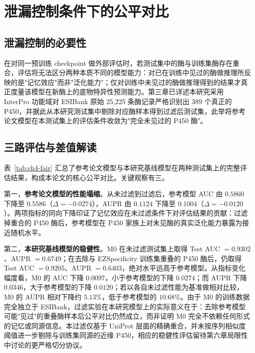 \section{泄漏控制条件下的公平对比}
\label{sec:ch4-fair}

\subsection{泄漏控制的必要性}

在对同一预训练 checkpoint 做外部评估时，若测试集中的酶与训练集酶存在重合，评估将无法区分两种本质不同的模型能力：对已在训练中见过的酶做推理所反映的是"记忆效应"而非"泛化能力"；仅对训练中未见过的酶做推理得到的结果才真正度量该模型在新酶上的底物特异性预测能力。第三章已详述本研究采用 InterPro\cite{Blum2025} 功能域对 ESIBank 原始 25{,}225 条酶记录严格识别出 389 个真正的 P450，并据此从本研究测试集中剔除对应酶样本得到过滤后测试集，此举将参考论文模型在本测试集上的评估条件收敛为"完全未见过的 P450 酶"。

\subsection{三路评估与差值解读}

表~\ref{tab:ch4-fair} 汇总了参考论文模型与本研究基线模型在两种测试集上的完整评估结果，构成本论文的核心公平对比。关键观察有三。

第一，\textbf{参考论文模型的性能塌缩}。从未过滤到过滤后，参考模型 AUC 由 $0.5860$ 下降至 $0.5586$（$\Delta = -0.0274$），AUPR 由 $0.1124$ 下降至 $0.1004$（$\Delta = -0.0120$）。两项指标的同向下降印证了记忆效应在未过滤条件下对评估结果的贡献：过滤掉重合的 P450 酶后，参考模型在 P450 家族上对未见酶的真实泛化能力暴露为接近随机水平。

第二，\textbf{本研究基线模型的稳健性}。M0 在未过滤测试集上取得 Test AUC $= 0.9302$、AUPR $= 0.6749$；在去除与 EZSpecificity 训练集重叠的 P450 酶后，仍取得 Test AUC $= 0.9205$、AUPR $= 0.6403$，绝对水平远高于参考模型。从指标变化幅度看，M0 的 AUC 下降 $0.0097$，小于参考模型的下降 $0.0274$；而 AUPR 下降 $0.0346$，大于参考模型的下降 $0.0120$；若以各自未过滤性能为基准做相对比较，M0 的 AUPR 相对下降约 $5.13\%$，低于参考模型的 $10.68\%$。由于 M0 的训练数据完全独立于 ESIBank，过滤实验在本研究模型上的实际意义在于：去除参考模型可能"见过"的重叠酶样本后公平对比仍然成立，而非证明 M0 完全不依赖任何形式的记忆或同源信息。本过滤仅基于 UniProt 层面的精确重合，并未按序列相似度阈值进一步剔除与训练集同源的近缘 P450，相应的稳健性评估留待第六章局限性中讨论的更严格切分协议。

